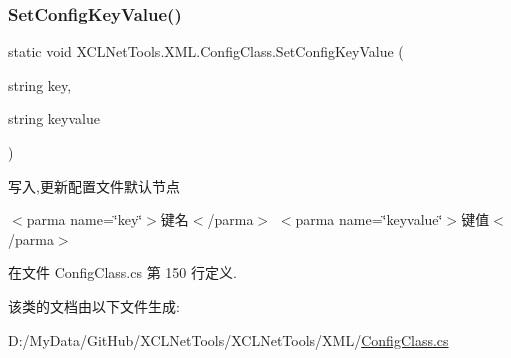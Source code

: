 \subsubsection{\texorpdfstring{Set\+Config\+Key\+Value()}{SetConfigKeyValue()}\hspace{0.1cm}{\footnotesize\ttfamily [2/2]}}
{\footnotesize\ttfamily static void X\+C\+L\+Net\+Tools.\+X\+M\+L.\+Config\+Class.\+Set\+Config\+Key\+Value (\begin{DoxyParamCaption}\item[{string}]{key,  }\item[{string}]{keyvalue }\end{DoxyParamCaption})\hspace{0.3cm}{\ttfamily [static]}}



写入,更新配置文件默认节点 

$<$parma name=\char`\"{}key\char`\"{}$>$键名$<$/parma$>$ $<$parma name=\char`\"{}keyvalue\char`\"{}$>$键值$<$/parma$>$ 

在文件 Config\+Class.\+cs 第 150 行定义.



该类的文档由以下文件生成\+:\begin{DoxyCompactItemize}
\item 
D\+:/\+My\+Data/\+Git\+Hub/\+X\+C\+L\+Net\+Tools/\+X\+C\+L\+Net\+Tools/\+X\+M\+L/\hyperlink{_config_class_8cs}{Config\+Class.\+cs}\end{DoxyCompactItemize}
